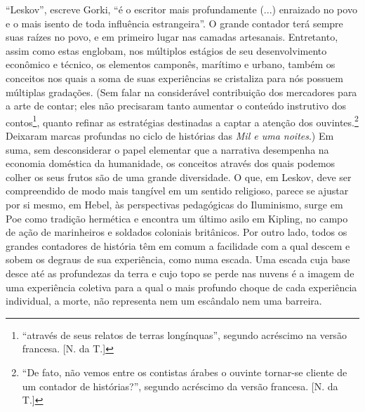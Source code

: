 ``Leskov'', escreve Gorki, ``é o escritor mais profundamente (...)
enraizado no povo e o mais isento de toda influência estrangeira''. O
grande contador terá sempre suas raízes no povo, e em primeiro lugar nas
camadas artesanais. Entretanto, assim como estas englobam, nos múltiplos
estágios de seu desenvolvimento econômico e técnico, os elementos
camponês, marítimo e urbano, também os conceitos nos quais a soma de
suas experiências se cristaliza para nós possuem múltiplas gradações.
(Sem falar na considerável contribuição dos mercadores para a arte de
contar; eles não precisaram tanto aumentar o conteúdo instrutivo dos
contos\footnote{``através de seus relatos de terras longínquas'',
  segundo acréscimo na versão francesa. {[}N. da T.{]}}, quanto refinar
as estratégias destinadas a captar a atenção dos ouvintes.\footnote{``De
  fato, não vemos entre os contistas árabes o ouvinte tornar-se cliente
  de um contador de histórias?'', segundo acréscimo da versão francesa.
  {[}N. da T.{]}} Deixaram marcas profundas no ciclo de histórias das
\emph{Mil e uma noites}.) Em suma, sem desconsiderar o papel elementar
que a narrativa desempenha na economia doméstica da humanidade, os
conceitos através dos quais podemos colher os seus frutos são de uma
grande diversidade. O que, em Leskov, deve ser compreendido de modo mais
tangível em um sentido religioso, parece se ajustar por si mesmo, em
Hebel, às perspectivas pedagógicas do Iluminismo, surge em Poe como
tradição hermética e encontra um último asilo em Kipling, no campo de
ação de marinheiros e soldados coloniais britânicos. Por outro lado,
todos os grandes contadores de história têm em comum a facilidade com a
qual descem e sobem os degraus de sua experiência, como numa escada. Uma
escada cuja base desce até as profundezas da terra e cujo topo se perde
nas nuvens é a imagem de uma experiência coletiva para a qual o mais
profundo choque de cada experiência individual, a morte, não representa
nem um escândalo nem uma barreira.


